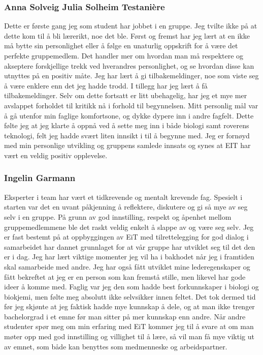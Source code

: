 \subsubsection{Anna Solveig Julia Solheim Testani\`{e}re}
Dette er første gang jeg som student har jobbet i en gruppe.
Jeg tvilte ikke på at dette kom til å bli lærerikt, noe det ble.
Først og fremst har jeg lært at en ikke må bytte sin personlighet eller å følge en unaturlig oppskrift for å være det perfekte gruppemedlem. 
Det handler mer om hvordan man må respektere og akseptere forskjellige trekk ved hverandres personlighet, og se hvordan disse kan utnyttes på en positiv måte. 
Jeg har lært å gi tilbakemeldinger, noe som viste seg å være enklere enn det jeg hadde trodd.
I tillegg har jeg lært å få tilbakemeldinger. 
Selv om dette fortsatt er litt ubehagelig, har jeg et mye mer avslappet forholdet til kritikk nå i forhold til begynnelsen. 
Mitt personlig mål var å gå utenfor min faglige komfortsone, og dykke dypere inn i andre fagfelt. 
Dette følte jeg at jeg klarte å oppnå ved å sette meg inn i både biologi samt roverens teknologi, felt jeg hadde svært liten innsikt i til å begynne med.
Jeg er fornøyd med min personlige utvikling og gruppens samlede innsats og synes at EIT har vært en veldig positiv opplevelse.\\
\subsubsection{Ingelin Garmann}
Eksperter i team har vært et tidkrevende og mentalt krevende fag. 
Spesielt i starten var det en uvant påkjenning å reflektere, diskutere og gi så mye av seg selv i en gruppe. 
På grunn av god innstilling, respekt og åpenhet mellom gruppemedlemmene ble det raskt veldig enkelt å slappe av og være seg selv.
Jeg er fast bestemt på at oppbyggingen av EiT med tilrettelegging for god dialog i samarbeidet har dannet grunnlaget for at vår gruppe har utviklet seg til det den er i dag.
Jeg har lært viktige momenter jeg vil ha i bakhodet når jeg i framtiden skal samarbeide med andre.
Jeg har også fått utviklet mine lederegenskaper og fått bekreftet at jeg er en person som kan fremstå stille, men likevel har gode ideer å komme med.
Faglig var jeg den som hadde best forkunnskaper i biologi og biokjemi, men følte meg absolutt ikke selvsikker innen feltet.
Det tok dermed tid før jeg skjønte at jeg faktisk hadde mye kunnskap å dele, og at man ikke trenger bachelorgrad i et emne før man sitter på mer kunnskap enn andre.
Når andre studenter spør meg om min erfaring med EiT kommer jeg til å svare at om man møter opp med god innstilling og villighet til å lære, så vil man få mye viktig ut av emnet, som både kan benyttes som medmenneske og arbeidspartner.\\
